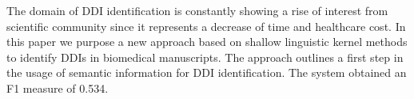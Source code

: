 The domain of DDI identification is constantly showing a rise of interest from scientific community since it represents a decrease of time and healthcare
 cost. In this paper we purpose a new approach based on shallow linguistic
 kernel methods to identify DDIs in biomedical manuscripts. The approach
 outlines a first step in the usage of semantic information for DDI
 identification. The system obtained an F1 measure of 0.534.


